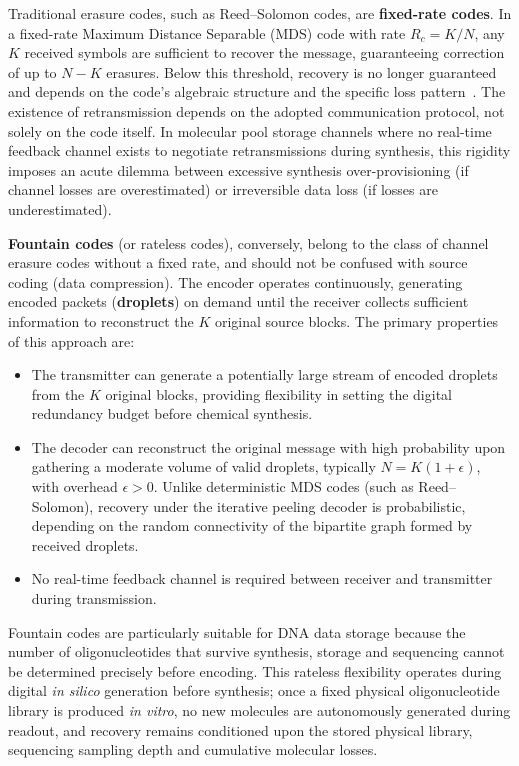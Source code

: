 Traditional erasure codes, such as Reed--Solomon codes, are \textbf{fixed-rate codes}. In a fixed-rate Maximum Distance Separable (MDS) code with rate $R_c = K/N$, any $K$ received symbols are sufficient to recover the message, guaranteeing correction of up to $N - K$ erasures. Below this threshold, recovery is no longer guaranteed and depends on the code's algebraic structure and the specific loss pattern~\cite{mackay2003}. The existence of retransmission depends on the adopted communication protocol, not solely on the code itself. In molecular pool storage channels where no real-time feedback channel exists to negotiate retransmissions during synthesis, this rigidity imposes an acute dilemma between excessive synthesis over-provisioning (if channel losses are overestimated) or irreversible data loss (if losses are underestimated).

\textbf{Fountain codes} (or rateless codes), conversely, belong to the class of channel erasure codes without a fixed rate, and should not be confused with source coding (data compression). The encoder operates continuously, generating encoded packets (\textbf{droplets}) on demand until the receiver collects sufficient information to reconstruct the $K$ original source blocks. The primary properties of this approach are:

\begin{itemize}
    \item The transmitter can generate a potentially large stream of encoded droplets from the $K$ original blocks, providing flexibility in setting the digital redundancy budget before chemical synthesis.
    
    \item The decoder can reconstruct the original message with high probability upon gathering a moderate volume of valid droplets, typically $N = K(1 + \epsilon)$, with overhead $\epsilon > 0$. Unlike deterministic MDS codes (such as Reed--Solomon), recovery under the iterative peeling decoder is probabilistic, depending on the random connectivity of the bipartite graph formed by received droplets.
    
    \item No real-time feedback channel is required between receiver and transmitter during transmission.
\end{itemize}

Fountain codes are particularly suitable for DNA data storage because the number of oligonucleotides that survive synthesis, storage and sequencing cannot be determined precisely before encoding. This rateless flexibility operates during digital \emph{in silico} generation before synthesis; once a fixed physical oligonucleotide library is produced \emph{in vitro}, no new molecules are autonomously generated during readout, and recovery remains conditioned upon the stored physical library, sequencing sampling depth and cumulative molecular losses.

